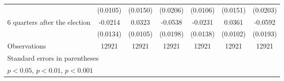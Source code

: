 \begin{table}[!ht]
\begin{tabular}{l*{6}{c}}
                    &    (0.0105)         &    (0.0150)         &    (0.0206)         &    (0.0106)         &    (0.0151)         &    (0.0203)         \\
[1em]
 6 quarters after the election&     -0.0214         &      0.0323\sym{**} &     -0.0538\sym{**} &     -0.0231         &      0.0361\sym{***}&     -0.0592\sym{**} \\
                    &    (0.0134)         &    (0.0105)         &    (0.0198)         &    (0.0138)         &    (0.0102)         &    (0.0193)         \\
\hline
Observations        &       12921         &       12921         &       12921         &       12921         &       12921         &       12921         \\
\hline\hline
\multicolumn{7}{l}{\footnotesize Standard errors in parentheses}\\
\multicolumn{7}{l}{\footnotesize \sym{*} \(p<0.05\), \sym{**} \(p<0.01\), \sym{***} \(p<0.001\)}\\
\end{tabular}
\end{table}
